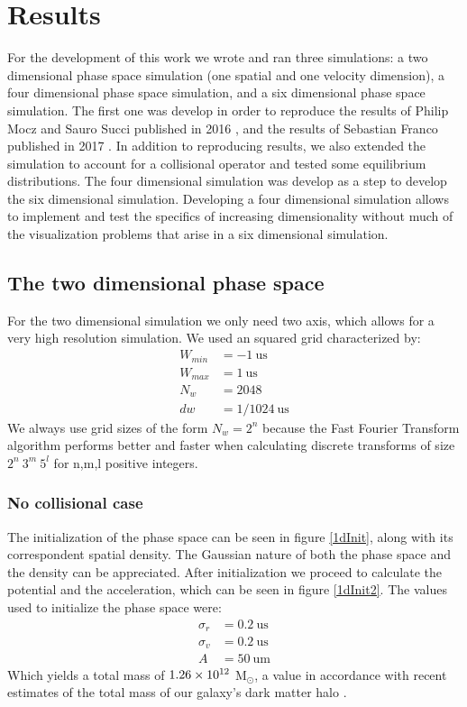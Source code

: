 \chapter{Results}
For the development of this work we wrote and ran three simulations: a  two dimensional phase space simulation (one spatial and one velocity dimension), a four dimensional phase space simulation, and a six dimensional phase space simulation. 
The first one was develop in order to reproduce the results of Philip Mocz and Sauro Succi published in 2016 \cite{integerLatticeDynamics}, and the results of Sebastian Franco published in 2017 \cite{franco}.
In addition to reproducing results, we also extended the simulation to account for a collisional operator and tested some equilibrium distributions.
The four dimensional simulation was develop as a step to develop the six dimensional simulation. Developing a four dimensional simulation allows to implement and test the specifics of increasing dimensionality without much of the visualization problems that arise in a six dimensional simulation.

\section{The two dimensional phase space}

For the two dimensional simulation we only need two axis, which allows for a very high resolution simulation. We used an squared grid characterized by:
\begin{align}
W_{min} &= -1 \ \text{us}\\
W_{max} &= 1 \ \text{us}\\
N_w &= 2048\\
dw &= 1/1024 \ \text{us}
\end{align}
We always use grid sizes of the form $N_w = 2^n$ because the Fast Fourier Transform algorithm performs better and faster when calculating discrete transforms of size $2^n \ 3^m \ 5^l$ for n,m,l positive integers.%
\subsection{No collisional case}
The initialization of the phase space can be seen in figure \ref{1dInit}, along with its correspondent spatial density.
The Gaussian nature of both the phase space and the density can be appreciated. 
After initialization we proceed to calculate the potential and the acceleration, which can be seen in figure \ref{1dInit2}.
The values used to initialize the phase space were:
\begin{align}
\sigma_r &= 0.2 \ \text{us} \\
\sigma_v &= 0.2 \ \text{us} \\
A &= 50  \ \text{um}
\end{align}
Which yields a total mass of $1.26\times 10^{12}$ M$_{\odot}$, a value in accordance with recent estimates of the total mass of our galaxy's dark matter halo \cite{2013JCAP07016N}.

